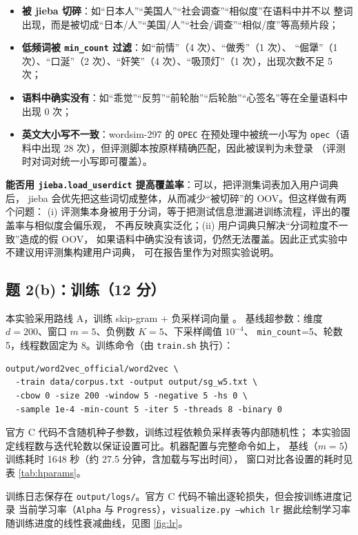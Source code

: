 \documentclass[11pt,a4paper]{article}
\begin{document}
\begin{itemize}
  \item \textbf{被 jieba 切碎}：如“日本人”“美国人”“社会调查”“相似度”在语料中并不以
  整词出现，而是被切成“日本/人”“美国/人”“社会/调查”“相似/度”等高频片段；
  \item \textbf{低频词被 \texttt{min\_count} 过滤}：如“前情”（4 次）、“做秀”（1 次）、
  “倔犟”（1 次）、“口涎”（2 次）、“奸笑”（4 次）、“吸顶灯”（1 次），出现次数不足 5 次；
  \item \textbf{语料中确实没有}：如“乖觉”“反剪”“前轮胎”“后轮胎”“心签名”等在全量语料中
  出现 0 次；
  \item \textbf{英文大小写不一致}：wordsim-297 的 \texttt{OPEC} 在预处理中被统一小写为
  \texttt{opec}（语料中出现 28 次），但评测脚本按原样精确匹配，因此被误判为未登录
  （评测时对词对统一小写即可覆盖）。
\end{itemize}

\textbf{能否用 \texttt{jieba.load\_userdict} 提高覆盖率}：可以，把评测集词表加入用户词典后，
jieba 会优先把这些词切成整体，从而减少“被切碎”的 OOV。但这样做有两个问题：
(i) 评测集本身被用于分词，等于把测试信息泄漏进训练流程，评出的覆盖率与相似度会偏乐观，
不再反映真实泛化；(ii) 用户词典只解决“分词粒度不一致”造成的假 OOV，
如果语料中确实没有该词，仍然无法覆盖。因此正式实验中不建议用评测集构建用户词典，
可在报告里作为对照实验说明。

\subsection{题 2(b)：训练（12 分）}

本实验采用路线 A，训练 skip-gram + 负采样词向量
\citep{mikolov2013efficient,mikolov2013distributed}。
基线超参数：维度 $d=200$、窗口 $m=5$、负例数 $K=5$、下采样阈值 $10^{-4}$、
\texttt{min\_count}=5、轮数 5，线程数固定为 8。训练命令（由 \texttt{train.sh} 执行）：

\begin{verbatim}
output/word2vec_official/word2vec \
  -train data/corpus.txt -output output/sg_w5.txt \
  -cbow 0 -size 200 -window 5 -negative 5 -hs 0 \
  -sample 1e-4 -min-count 5 -iter 5 -threads 8 -binary 0
\end{verbatim}

官方 C 代码不含随机种子参数，训练过程依赖负采样表等内部随机性；
本实验固定线程数与迭代轮数以保证设置可比。机器配置与完整命令如上，
基线（$m=5$）训练耗时 1648 秒（约 27.5 分钟，含加载与写出时间），
窗口对比各设置的耗时见表 \ref{tab:hparams}。

训练日志保存在 \texttt{output/logs/}。官方 C 代码不输出逐轮损失，但会按训练进度记录
当前学习率（\texttt{Alpha} 与 \texttt{Progress}），\texttt{visualize.py --which lr}
据此绘制学习率随训练进度的线性衰减曲线，见图 \ref{fig:lr}。
\end{document}
